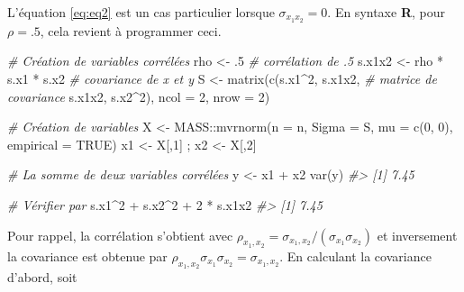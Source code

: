 \documentclass[
]{book}
\newenvironment{Shaded}{}{}
\newcommand{\AttributeTok}[1]{#1}
\newcommand{\CommentTok}[1]{\textit{#1}}
\newcommand{\ConstantTok}[1]{#1}
\newcommand{\DecValTok}[1]{#1}
\newcommand{\FunctionTok}[1]{#1}
\newcommand{\NormalTok}[1]{#1}
\newcommand{\OtherTok}[1]{#1}
\newcommand{\SpecialCharTok}[1]{#1}
\begin{document}
L'équation \eqref{eq:eq2} est un cas particulier lorsque \(\sigma_{x_1 x_2}=0\). En syntaxe \textbf{R}, pour \(\rho = .5\), cela revient à programmer ceci.

\begin{Shaded}
\begin{Highlighting}[]
\CommentTok{\# Création de variables corrélées}
\NormalTok{rho }\OtherTok{\textless{}{-}}\NormalTok{ .}\DecValTok{5}                          \CommentTok{\# corrélation de .5}
\NormalTok{s.x1x2 }\OtherTok{\textless{}{-}}\NormalTok{ rho }\SpecialCharTok{*}\NormalTok{ s.x1 }\SpecialCharTok{*}\NormalTok{ s.x2        }\CommentTok{\# covariance de x et y}
\NormalTok{S }\OtherTok{\textless{}{-}} \FunctionTok{matrix}\NormalTok{(}\FunctionTok{c}\NormalTok{(s.x1}\SpecialCharTok{\^{}}\DecValTok{2}\NormalTok{, s.x1x2,      }\CommentTok{\# matrice de covariance}
\NormalTok{             s.x1x2, s.x2}\SpecialCharTok{\^{}}\DecValTok{2}\NormalTok{), }\AttributeTok{ncol =}  \DecValTok{2}\NormalTok{, }\AttributeTok{nrow =} \DecValTok{2}\NormalTok{)}

\CommentTok{\# Création de variables}
\NormalTok{X }\OtherTok{\textless{}{-}}\NormalTok{ MASS}\SpecialCharTok{::}\FunctionTok{mvrnorm}\NormalTok{(}\AttributeTok{n =}\NormalTok{ n, }\AttributeTok{Sigma =}\NormalTok{ S, }\AttributeTok{mu =} \FunctionTok{c}\NormalTok{(}\DecValTok{0}\NormalTok{, }\DecValTok{0}\NormalTok{), }\AttributeTok{empirical =} \ConstantTok{TRUE}\NormalTok{)}
\NormalTok{x1 }\OtherTok{\textless{}{-}}\NormalTok{ X[,}\DecValTok{1}\NormalTok{] ; x2 }\OtherTok{\textless{}{-}}\NormalTok{ X[,}\DecValTok{2}\NormalTok{]}

\CommentTok{\# La somme de deux variables corrélées}
\NormalTok{y }\OtherTok{\textless{}{-}}\NormalTok{ x1 }\SpecialCharTok{+}\NormalTok{ x2}
\FunctionTok{var}\NormalTok{(y)}
\CommentTok{\#\textgreater{} [1] 7.45}

\CommentTok{\# Vérifier par}
\NormalTok{s.x1}\SpecialCharTok{\^{}}\DecValTok{2} \SpecialCharTok{+}\NormalTok{ s.x2}\SpecialCharTok{\^{}}\DecValTok{2} \SpecialCharTok{+} \DecValTok{2} \SpecialCharTok{*}\NormalTok{ s.x1x2}
\CommentTok{\#\textgreater{} [1] 7.45}
\end{Highlighting}
\end{Shaded}

Pour rappel, la corrélation s'obtient avec \(\rho_{x_1,x_2}=\sigma_{x_1,x_2}/(\sigma_{x_1} \sigma_{x_2})\) et inversement la covariance est obtenue par \(\rho_{x_1,x_2} \sigma_{x_1} \sigma_{x_2}=\sigma_{x_1,x_2}\). En calculant la covariance d'abord, soit
\end{document}
